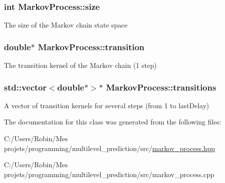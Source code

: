 \subsubsection[{size}]{\setlength{\rightskip}{0pt plus 5cm}int Markov\+Process\+::size}\label{class_markov_process_ad38170c3a73d113dc152e73bc57d0523}
The size of the Markov chain state space \hypertarget{class_markov_process_aae914f9e4fa973b5515bebc41508a289}{}
\subsubsection[{transition}]{\setlength{\rightskip}{0pt plus 5cm}double$\ast$ Markov\+Process\+::transition}\label{class_markov_process_aae914f9e4fa973b5515bebc41508a289}
The transition kernel of the Markov chain (1 step) \hypertarget{class_markov_process_a16e4250dba911530aff3d2766a367e5b}{}
\subsubsection[{transitions}]{\setlength{\rightskip}{0pt plus 5cm}std\+::vector$<$double$\ast$$>$$\ast$ Markov\+Process\+::transitions}\label{class_markov_process_a16e4250dba911530aff3d2766a367e5b}
A vector of transition kernels for several steps (from 1 to last\+Delay) 

The documentation for this class was generated from the following files\+:\begin{DoxyCompactItemize}
\item 
C\+:/\+Users/\+Robin/\+Mes projets/programming/multilevel\+\_\+prediction/src/\hyperlink{markov__process_8hpp}{markov\+\_\+process.\+hpp}\item 
C\+:/\+Users/\+Robin/\+Mes projets/programming/multilevel\+\_\+prediction/src/markov\+\_\+process.\+cpp\end{DoxyCompactItemize}
